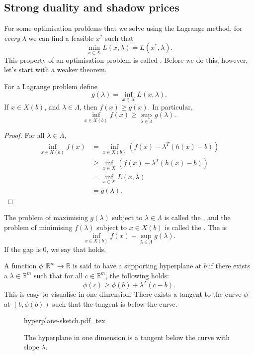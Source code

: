 \documentclass[a4paper]{scrartcl}
\newcommand{\incfig}[2]{%
    \def\svgwidth{#1mm}
    {#2.pdf_tex}
}
\begin{document}
\subsection{Strong duality and shadow prices}
For some optimisation problems that we solve using the Lagrange method, for \emph{every} $\lambda$ we can find a feasible $x^*$ such that 
\[\min_{x \in X} L (x, \lambda)=L(x^*,\lambda).\]
This property of an optimisation problem is called .
Before we do this, however, let's start with a weaker theorem.
\begin{theorem}
	 For a Lagrange problem define 
	 \[g (\lambda)=\inf_{x \in X}L (x,\lambda).\]
	 If $x \in X (b)$, and $\lambda \in \Lambda$, then $f (x)\geq g (x)$. In particular,
	 \[\inf_{x \in X(b)}f(x) \geq \sup_{\lambda \in \Lambda}g (\lambda).\]
\end{theorem}
\begin{proof}
	For all $\lambda \in \Lambda$,
	 \begin{equation*}
		  \begin{split}
			\inf_{x \in X(b)}f(x)&=\inf_{x \in X(b)}(f(x)- \lambda^T (h(x)-b))\\
			&\geq \inf_{x \in X}(f(x)- \lambda^T (h(x)-b))\\
			&=\inf_{x \in X}L (x,\lambda)\\
			&=g (\lambda).
		  \end{split}
	 \end{equation*}
	 
\end{proof}

The problem of maximising $g (\lambda)$ subject to $\lambda \in \Lambda$ is called the , and the problem of minimising $f (\lambda)$ subject to $x \in X(b)$ is called the .\newline 
The  is 
\[\inf_{x \in X(b)}f(x)- \sup_{\lambda \in \Lambda}g (\lambda).\]
If the gap is 0, we say that  holds.
\begin{definition*}[Hyperplane]
	 A function $\phi: \mathbb{R}^{m} \to \mathbb{R} $ is said to have a supporting hyperplane at $b$ if there exists a $\lambda \in \mathbb{R}^{m}$ such that for all $c \in \mathbb{R}^{m} $, the following holds: 
	 \[\phi(c)\geq \phi (b)+ \lambda^T (c-b).\]
	 This is easy to visualise in one dimension: There exists a tangent to the curve $\phi$ at $(b,\phi(b))$ such that the tangent is below the curve.
	 \begin{figure}[H]
		\centering
		\incfig{70}{hyperplane-sketch}
		\caption{The hyperplane in one dimension is a tangent below the curve with slope $\lambda$.}
	\end{figure}
\end{definition*}
\end{document}
